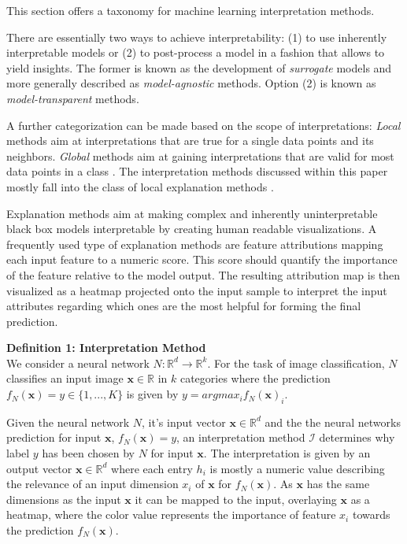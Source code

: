This section offers a taxonomy for machine learning interpretation methods.

There are essentially two ways to achieve interpretability: (1) to use inherently interpretable models or (2) to post-process a model in a fashion that allows to yield insights. The former is known as the development of \textit{surrogate} models and more generally described as \textit{model-agnostic} methods. Option (2) is known as \textit{model-transparent} methods. 

A further categorization can be made based on the scope of interpretations: \textit{Local} methods aim at interpretations that are true for a single data points and its neighbors. 
\textit{Global} methods aim at gaining interpretations that are valid for most data points in a class \cite{kim2018interpretability, nguyen2017plug, yosinski2015understanding}. The interpretation methods discussed within this paper mostly fall into the class of local explanation methods \cite{ribeiro2016should, lundberg2017unified}. %

Explanation methods aim at making complex and inherently uninterpretable black box models interpretable by creating human readable visualizations. 
A frequently used type of explanation methods are feature attributions mapping each input feature to a numeric score. This score should quantify the importance of the feature relative to the model output. The resulting attribution map is then visualized as a heatmap projected onto the input sample to interpret the input attributes regarding which ones are the most helpful for forming the final prediction. 

\textbf{Definition 1: Interpretation Method}\\
We consider a neural network $N: \mathbb{R}^d \to \mathbb{R}^k$. For the task of image classification, $N$ classifies an input image $\mathbf{x}\in \mathbb{R}$ in $k$ categories where the prediction $f_N(\mathbf{x})=y \in \{1, ..., K\}$ is given by $y = arg max_i f_N(\mathbf{x})_i$.

Given the neural network $N$, it's input vector $\mathbf{x} \in \mathbb{R}^d$ and the the neural networks prediction for input $\mathbf{x}$, $f_N(\mathbf{x})=y$, an interpretation method $\mathcal{I}$ determines why label $y$ has been chosen by $N$ for input $\mathbf{x}$. 
The interpretation is given by an output vector $\mathbf{x} \in \mathbb{R}^d$ where each entry $h_i$ is mostly a numeric value describing the relevance of an input dimension $x_i$ of $\mathbf{x}$ for $f_N(\mathbf{x})$. 
As $\mathbf{x}$ has the same dimensions as the input $\mathbf{x}$ it can be mapped to the input, overlaying $\mathbf{x}$ as a heatmap, where the color value represents the importance of feature $x_i$ towards the prediction $f_N(\mathbf{x})$.

